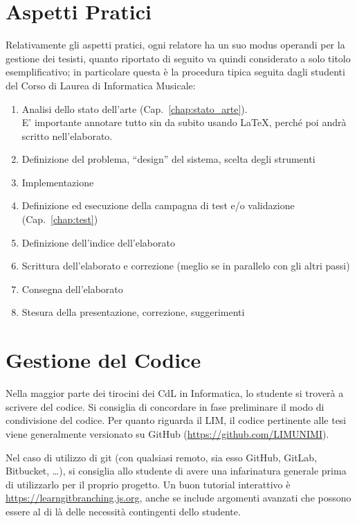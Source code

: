 \documentclass[12pt]{report}
\begin{document}
\section{Aspetti Pratici}
Relativamente gli aspetti pratici, ogni relatore ha un suo modus operandi per la gestione dei tesisti, quanto riportato di seguito va quindi considerato a solo titolo esemplificativo; in particolare questa è la procedura tipica seguita dagli studenti del Corso di Laurea di Informatica Musicale:
\begin{enumerate}
    \item Analisi dello stato dell'arte (Cap.~\ref{chap:stato_arte}).\\E' importante annotare tutto sin da subito usando \LaTeX, perché poi andrà scritto nell'elaborato.
    \item Definizione del problema, ``design'' del sistema, scelta degli strumenti
    \item Implementazione
    \item Definizione ed esecuzione della campagna di test e/o validazione (Cap.~\ref{chap:test})
    \item Definizione dell'indice dell'elaborato
    \item Scrittura dell'elaborato e correzione (meglio se in parallelo con gli altri passi)
    \item Consegna dell'elaborato
    \item Stesura della presentazione, correzione, suggerimenti
\end{enumerate}

\section{Gestione del Codice}
Nella maggior parte dei tirocini dei CdL in Informatica, lo studente si troverà a scrivere del codice. Si consiglia di concordare in fase preliminare il modo di condivisione del codice.
Per quanto riguarda il LIM, il codice pertinente alle tesi viene generalmente versionato su GitHub (\url{https://github.com/LIMUNIMI}).

Nel caso di utilizzo di git (con qualsiasi remoto, sia esso GitHub, GitLab, Bitbucket, \dots), si consiglia allo studente di avere una infarinatura generale prima di utilizzarlo per il proprio progetto. Un buon tutorial interattivo è \url{https://learngitbranching.js.org}, anche se include argomenti avanzati che possono essere al di là delle necessità contingenti dello studente.
\end{document}
